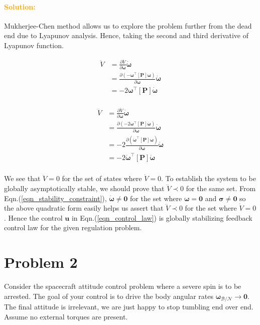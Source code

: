 \documentclass{article}
\begin{document}
\paragraph{\textcolor{orange}{Solution:}}

Mukherjee-Chen method allows us to explore the problem further from the dead end due to Lyapunov analysis. Hence, taking the second and third derivative of Lyapunov function.

\begin{equation}
  \begin{split}
    \ddot{V}&=\frac{\partial\dot{V}}{\partial\bm{\omega}}\dot{\bm{\omega}}\\
    &=\frac{\partial\left(-\bm{\omega}^{\intercal}[\bm{P}]\bm{\omega}\right)}{\partial\bm{\omega}}\dot{\bm{\omega}}\\
    &=-2\bm{\omega}^{\intercal}[\bm{P}]\dot{\bm{\omega}}\\
  \end{split}
\end{equation}

\begin{equation}
  \begin{split}
    \dddot{V}&=\frac{\partial\ddot{V}}{\partial\bm{\omega}}\dot{\bm{\omega}}\\
    &=\frac{\partial\left(-2\bm{\omega}^{\intercal}[\bm{P}]\dot{\bm{\omega}}\right)}{\partial\bm{\omega}}\dot{\bm{\omega}}\\
    &=-2\frac{\partial\left(\dot{\bm{\omega}}^{\intercal}[\bm{P}]\bm{\omega}\right)}{\partial\bm{\omega}}\dot{\bm{\omega}}\\
    &=-2\dot{\bm{\omega}}^{\intercal}[\bm{P}]\dot{\bm{\omega}}\\
  \end{split}
\end{equation}

We see that $\ddot{V}=0$ for the set of states where $\dot{V}=0$. To establish the system to be globally asymptotically stable, we should prove that $\dddot{V}\prec0$ for the same set. From Eqn.(\ref{eqn_stability_constraint}), $\dot{\bm{\omega}}\neq\bm{0}$ for the set where $\bm{\omega}=\bm{0}$ and $\bm{\sigma}\neq\bm{0}$ so the above quadratic form easily helps us assert that $\dddot{V}\prec0$ for the set where $\dot{V}=0$. Hence the control $\bm{u}$ in Eqn.(\ref{eqn_control_law}) is globally stabilizing feedback control law for the given regulation problem.

\newpage
\section{Problem 2}
Consider the spacecraft attitude control problem where a severe spin is to be arrested.  The goal of your control is to drive the body angular rates $\bm{\omega}_{\mathcal{B}/\mathcal{N}} \rightarrow \bm{0}$.  The final attitude is irrelevant, we are just happy to stop tumbling end over end.   Assume no external torques are present.
\end{document}
